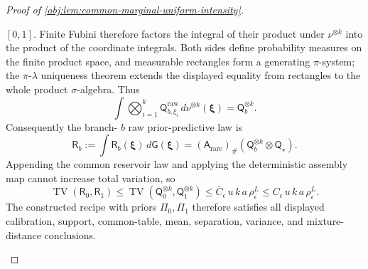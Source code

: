 \begin{proof}[Proof of \cref{obj:lem:common-marginal-uniform-intensity}]
\begin{enumerate}
\([0,1]\). Finite Fubini therefore factors the integral of their product under
\(\nu^{\otimes k}\) into the product of the coordinate integrals. Both sides define probability
measures on the finite product space, and measurable rectangles form a generating \(\pi\)-system;
the \(\pi\)-\(\lambda\) uniqueness theorem extends the displayed equality from rectangles to the
whole product \(\sigma\)-algebra. Thus
\[
\int \bigotimes_{i=1}^k
\mathsf Q^{\mathrm{raw}}_{b,\xi_i}\,d\nu^{\otimes k}(\boldsymbol\xi)
=
\mathsf Q_b^{\otimes k}.
\]
Consequently the branch-
\(b\) raw prior-predictive law is
\[
\mathsf R_b
:=
\int \mathsf R_b(\boldsymbol\xi)\,d\mathsf G(\boldsymbol\xi)
=
(\mathsf A_{\mathrm{rare}})_\#\left(\mathsf Q_b^{\otimes k}\otimes\mathsf Q_\star\right).
\]
Appending the common reservoir law and applying the deterministic assembly map cannot increase total variation, so
\[
\operatorname{TV}(\mathsf R_0,\mathsf R_1)
\le
\operatorname{TV}(\mathsf Q_0^{\otimes k},\mathsf Q_1^{\otimes k})
\le
\bar C_\epsilon\,u\,k\,a\,\rho_\epsilon^L
\le
C_\epsilon\,u\,k\,a\,\rho_\epsilon^L .
\]
The constructed recipe with priors \(\Pi_0,\Pi_1\) therefore satisfies all displayed calibration, support, common-table, mean, separation, variance, and mixture-distance conclusions. %
\end{enumerate}
\end{proof}
